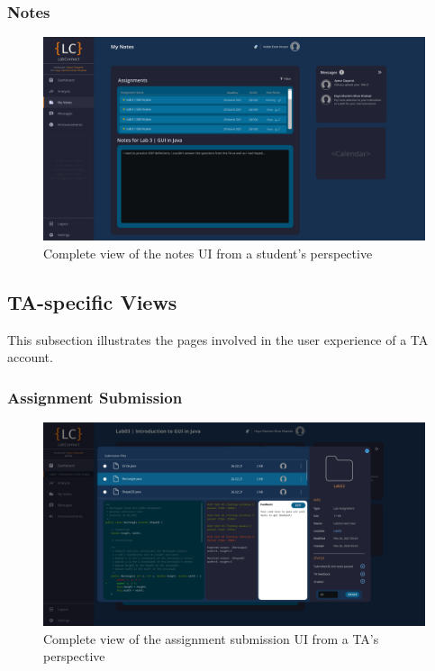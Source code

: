 \documentclass[a4paper, 12pt]{article}
\begin{document}
    \subsubsection{Notes}
    
    \begin{figure}[H]
        \centering
        \includegraphics[width=\textwidth]{student_notes}
        \caption{Complete view of the notes UI from a student's perspective}
        \label{fig:student_notes_full}
    \end{figure}
    
    
    
    
    
    
    
    
    
    
    
    
    \pagebreak
    
    
    \subsection{TA-specific Views}
    
    This subsection illustrates the pages involved in the user experience of a TA account.
    
    \subsubsection{Assignment Submission}
    
    \begin{figure}[H]
        \centering
        \includegraphics[width=\textwidth]{ta_assignment_submission}
        \caption{Complete view of the assignment submission UI from a TA's perspective}
        \label{fig:ta_assignment_submission_full}
    \end{figure}
    
\end{document}
